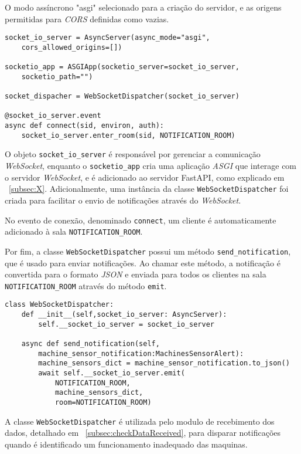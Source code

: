 O modo assíncrono "asgi" selecionado para a criação do servidor, e as origens permitidas para \textit{CORS} definidas como vazias.

\begin{verbatim}
socket_io_server = AsyncServer(async_mode="asgi",
    cors_allowed_origins=[])

socketio_app = ASGIApp(socketio_server=socket_io_server,
    socketio_path="")

socket_dispacher = WebSocketDispatcher(socket_io_server)

@socket_io_server.event
async def connect(sid, environ, auth):
    socket_io_server.enter_room(sid, NOTIFICATION_ROOM)
\end{verbatim}

O objeto \texttt{socket\_io\_server} é responsável por gerenciar a comunicação \textit{WebSocket}, enquanto o \texttt{socketio\_app} cria uma aplicação \textit{ASGI} que interage com o servidor \textit{WebSocket}, e é adicionado ao servidor FastAPI, como explicado em ~\ref{subsec:X}. Adicionalmente, uma instância da classe \texttt{WebSocketDispatcher} foi criada para facilitar o envio de notificações através do \textit{WebSocket}.

No evento de conexão, denominado \texttt{connect}, um cliente é automaticamente adicionado à sala \texttt{NOTIFICATION\_ROOM}.

Por fim, a classe \texttt{WebSocketDispatcher} possui um método \texttt{send\_notification}, que é usado para enviar notificações. Ao chamar este método, a notificação é convertida para o formato \textit{JSON} e enviada para todos os clientes na sala \texttt{NOTIFICATION\_ROOM} através do método \texttt{emit}.

\begin{verbatim}
class WebSocketDispatcher:
    def __init__(self,socket_io_server: AsyncServer):
        self.__socket_io_server = socket_io_server
    
    async def send_notification(self,
        machine_sensor_notification:MachinesSensorAlert):
        machine_sensors_dict = machine_sensor_notification.to_json()
        await self.__socket_io_server.emit(
            NOTIFICATION_ROOM,
            machine_sensors_dict,
            room=NOTIFICATION_ROOM)
\end{verbatim}

A classe \texttt{WebSocketDispatcher} é utilizada pelo modulo de recebimento dos dados, detalhado em ~\ref{subsec:checkDataReceived}, para disparar notificações quando é identificado um funcionamento inadequado das maquinas.


